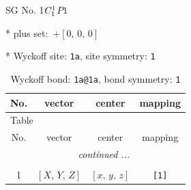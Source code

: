 \documentclass[fleqn,8pt]{jsarticle}
\begin{document}
\setcounter{MaxMatrixCols}{32}

\renewcommand{\tablename}{Table~}
\renewcommand{\figurename}{Figure~}
\begin{center}
\LARGE
SG No. 1\quad$C_{\rm 1}^{1}$\quad$P1$\quad[ triclinic ]
\end{center}

* plus set:\,\,\,$+\left[ 0,\, 0,\, 0 \right]$


* Wyckoff site: {\tt 1a}, site symmetry: {\tt 1}
\renewcommand{\arraystretch}{1.2}
\begin{longtable}{cccc}
\caption{Wyckoff bond: {\tt 1a@1a}, bond symmetry: {\tt 1}}
 \\
 \hline \hline
No. & vector & center & mapping \\ \hline \endfirsthead

\multicolumn{3}{l}{\tablename\ \thetable{}} \\
 \hline \hline
No. & vector & center & mapping \\ \hline \endhead

 \hline \hline
\multicolumn{3}{r}{\footnotesize\it continued ...} \\ \endfoot

 \hline \hline
\multicolumn{3}{r}{} \\ \endlastfoot

1 & $\left[ X,\, Y,\, Z \right]$ & $\left[ x,\, y,\, z \right]$ & {\tt [1]} \\
\end{longtable}
\end{document}
